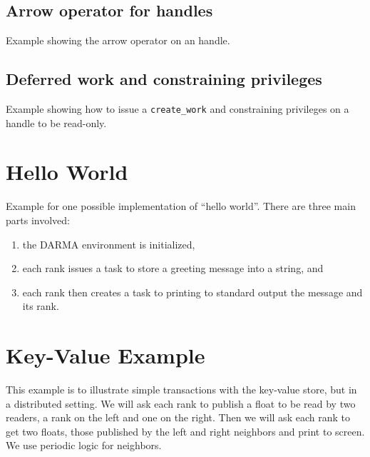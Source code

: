 \subsection{Arrow operator for handles}
Example showing the arrow operator on an handle.


\subsection{Deferred work and constraining privileges}
Example showing how to issue a \texttt{create\_work} and constraining privileges on a handle to be read-only.






\section{Hello World}

Example for one possible implementation of ``hello world''. 
There are three main parts involved: 
\begin{enumerate}
\item the DARMA environment is initialized, 
\item each rank issues a task to store a greeting message into a string, and
\item each rank then creates a task to printing to standard output the message and its rank.
\end{enumerate}





\section{Key-Value Example}

This example is to illustrate simple transactions with the key-value store, 
but in a distributed setting. We will ask each rank to publish a float to be
read by two readers, a rank on the left and one on the right. Then we will ask
each rank to get two floats, those published by the left and right neighbors
and print to screen. We use periodic logic for neighbors.







